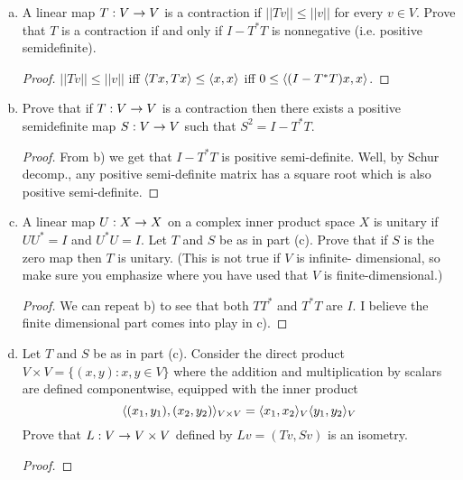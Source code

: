 \begin{itemize}
\begin{enumerate}[(a)]
\item A linear map $T : V \rightarrow V$ is a contraction if $||Tv|| \leq ||v||$ for every
$v \in V$. Prove that $T$ is a contraction if and only if $I - T^{*}T$ is nonnegative (i.e. positive semidefinite).
\begin{proof}
    $||Tv|| \leq ||v||$ iff $\langle{}Tx,Tx\rangle \leq \langle{}x,x\rangle$ iff $0 \leq \langle{}(I - T^*T)x,x\rangle$.
\end{proof}

\item Prove that if $T : V \rightarrow V$ is a contraction then there exists a positive
semidefinite map $S : V \rightarrow V$ such that $S^2 = I - T^{*}T$.
\begin{proof}
    From b) we get that $I - T^*T$ is positive semi-definite. Well, by Schur decomp., any positive semi-definite matrix has a square root which is also positive semi-definite.
\end{proof}

\item A linear map $U : X \rightarrow X$ on a complex inner product space $X$ is
unitary if $UU^{*} = I$ and $U^{*}U = I$. Let $T$ and $S$ be as in part (c). Prove that if $S$ is the zero map then $T$ is unitary. (This is not true if $V$ is infinite-
dimensional, so make sure you emphasize where you have used that $V$ is finite-dimensional.)
\begin{proof}
    We can repeat b) to see that both $TT^*$ and $T^*T$ are $I$. I believe the finite dimensional part comes into play in c).
\end{proof}

\item Let $T$ and $S$ be as in part (c). Consider the direct product $V \times V =
\{(x, y): x, y \in V\}$ where the addition and multiplication by scalars are defined
componentwise, equipped with the inner product
$$\langle{}(x_1, y_1),(x_2, y_2)\rangle_{V \times V} = \langle{}x_1,x_2\rangle_{V} \langle{}y_1,y_2\rangle_{V}$$
Prove that $L : V \rightarrow V \times V$ defined by $Lv = (T v, Sv)$ is an isometry.
\begin{proof}

\end{proof}
\end{enumerate}









\end{itemize}
